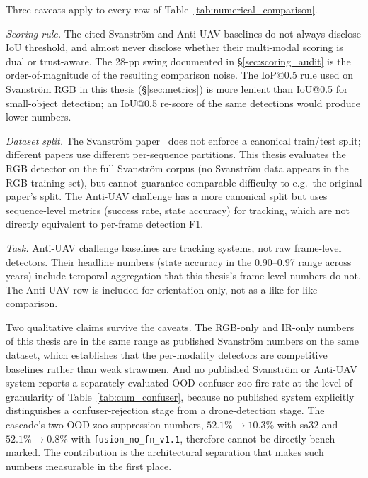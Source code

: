 \documentclass[12pt,a4paper,oneside,openright]{book}
\begin{document}
Three caveats apply to every row of Table~\ref{tab:numerical_comparison}.

\emph{Scoring rule.} The cited Svanstr\"om and Anti-UAV baselines do not always disclose IoU threshold, and almost never disclose whether their multi-modal scoring is dual or trust-aware. The 28-pp swing documented in \S\ref{sec:scoring_audit} is the order-of-magnitude of the resulting comparison noise. The IoP@0.5 rule used on Svanstr\"om RGB in this thesis (\S\ref{sec:metrics}) is more lenient than IoU@0.5 for small-object detection; an IoU@0.5 re-score of the same detections would produce lower numbers.

\emph{Dataset split.} The Svanstr\"om paper~\cite{svanstrom2021real} does not enforce a canonical train/test split; different papers use different per-sequence partitions. This thesis evaluates the RGB detector on the full Svanstr\"om corpus (no Svanstr\"om data appears in the RGB training set), but cannot guarantee comparable difficulty to e.g.\ the original paper's split. The Anti-UAV challenge has a more canonical split but uses sequence-level metrics (success rate, state accuracy) for tracking, which are not directly equivalent to per-frame detection F1.

\emph{Task.} Anti-UAV challenge baselines are tracking systems, not raw frame-level detectors. Their headline numbers (state accuracy in the 0.90--0.97 range across years) include temporal aggregation that this thesis's frame-level numbers do not. The Anti-UAV row is included for orientation only, not as a like-for-like comparison.

Two qualitative claims survive the caveats. The RGB-only and IR-only numbers of this thesis are in the same range as published Svanstr\"om numbers on the same dataset, which establishes that the per-modality detectors are competitive baselines rather than weak strawmen. And no published Svanstr\"om or Anti-UAV system reports a separately-evaluated OOD confuser-zoo fire rate at the level of granularity of Table~\ref{tab:cum_confuser}, because no published system explicitly distinguishes a confuser-rejection stage from a drone-detection stage. The cascade's two OOD-zoo suppression numbers, $52.1\% \to 10.3\%$ with sa32 and $52.1\% \to 0.8\%$ with \texttt{fusion\_no\_fn\_v1.1}, therefore cannot be directly bench-marked. The contribution is the architectural separation that makes such numbers measurable in the first place.

\end{document}

